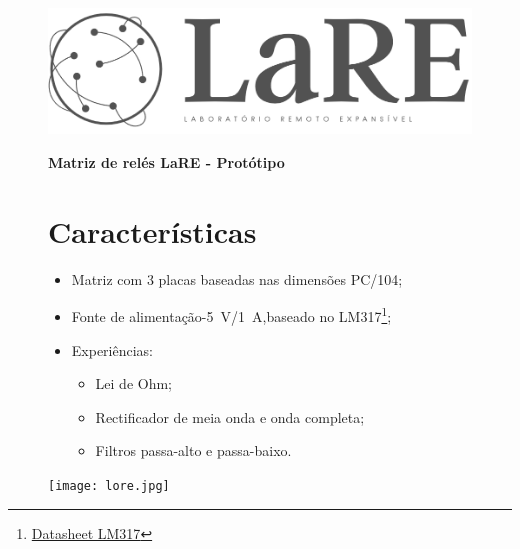 \chead {\today}

\onecolumn

\begin{figure}
\begin{minipage}{0.47\textwidth}
\centering
\includegraphics[width=.7\textwidth,left,]{logo.jpg}

\end{minipage}
\hfill
\begin{minipage}{0.47\textwidth}
\raggedleft
\Huge \textbf{Matriz de relés LaRE - Protótipo}
\end{minipage}
\end{figure}


\begin{figure}
\begin{minipage}{0.47\textwidth}

\section{Características}
\begin{itemize}
    \item Matriz com 3 placas baseadas nas dimensões PC/104;
    \item Fonte de alimentação-\SI{5}{\volt}/\SI{1}{\ampere},\newline baseado no LM317\footnote{\href{https://www.ti.com/lit/ds/symlink/lm317.pdf}{Datasheet LM317}};
    \item Experiências:
    \begin{itemize}
        \item Lei de Ohm;
        \item Rectificador de meia onda e onda completa;
        \item Filtros passa-alto e passa-baixo.
    \end{itemize}
\end{itemize}


\end{minipage}
\hfill
\begin{minipage}{0.47\textwidth}
\centering
\texttt{[image: lore.jpg]}

\end{minipage}
\end{figure}

